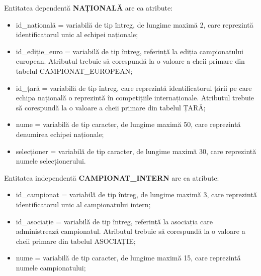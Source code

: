 \documentclass{article}
\begin{document}
\begin{spacing}{1.1}
	\vspace{0.3cm}
	
	Entitatea dependentă \textbf{NAȚIONALĂ} are ca atribute:
	
	\begin{itemize}
		\item id\_națională = variabilă de tip întreg, de lungime maximă 2, care reprezintă identificatorul unic al echipei naționale;
		
		\item id\_ediție\_euro = variabilă de tip întreg, referință la ediția campionatului european. Atributul trebuie să corespundă la o valoare a cheii primare din tabelul CAMPIONAT\_EUROPEAN;
		
		\item id\_țară = variabilă de tip întreg, care reprezintă identificatorul țării pe care echipa națională o reprezintă în competițiile internaționale. Atributul trebuie să corespundă la o valoare a cheii primare din tabelul ȚARĂ;
		
		\item nume = variabilă de tip caracter, de lungime maximă 50, care reprezintă denumirea echipei naționale;
		
		\item selecționer = variabilă de tip caracter, de lungime maximă 30, care reprezintă numele selecționerului.
	\end{itemize}
	
	\vspace{0.3cm}
	
	Entitatea independentă \textbf{CAMPIONAT\_INTERN} are ca atribute:
	
	\begin{itemize}
		\item id\_campionat = variabilă de tip întreg, de lungime maximă 3, care reprezintă identificatorul unic al campionatului intern;
		
		\item id\_asociație = variabilă de tip întreg, referință la asociația care administrează campionatul. Atributul trebuie să corespundă la o valoare a cheii primare din tabelul ASOCIAȚIE;
		
		
		\item nume = variabilă de tip caracter, de lungime maximă 15, care reprezintă numele campionatului;
		

\end{itemize}
\end{spacing}
\end{document}
